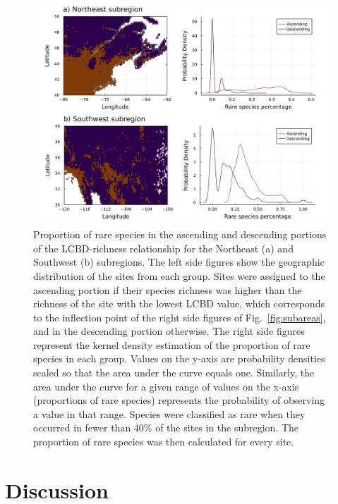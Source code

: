 \documentclass[11pt]{article}
\makeatletter
\def\maxwidth{\ifdim\Gin@nat@width>\linewidth\linewidth
\else\Gin@nat@width\fi}
\let\Oldincludegraphics\includegraphics
\renewcommand{\includegraphics}[1]{\Oldincludegraphics[width=\maxwidth]{#1}}
\makeatother
\begin{document}
\begin{figure}
\hypertarget{fig:rarespecies}{%
\centering
\includegraphics{figures/rare-species.png}
\caption{Proportion of rare species in the ascending and descending
portions of the LCBD-richness relationship for the Northeast (a) and
Southwest (b) subregions. The left side figures show the geographic
distribution of the sites from each group. Sites were assigned to the
ascending portion if their species richness was higher than the richness
of the site with the lowest LCBD value, which corresponds to the
inflection point of the right side figures of Fig.~\ref{fig:subareas},
and in the descending portion otherwise. The right side figures
represent the kernel density estimation of the proportion of rare
species in each group. Values on the y-axis are probability densities
scaled so that the area under the curve equals one. Similarly, the area
under the curve for a given range of values on the x-axis (proportions
of rare species) represents the probability of observing a value in that
range. Species were classified as rare when they occurred in fewer than
40\% of the sites in the subregion. The proportion of rare species was
then calculated for every site.}\label{fig:rarespecies}
}
\end{figure}

\hypertarget{discussion}{%
\section{Discussion}\label{discussion}}
\end{document}

